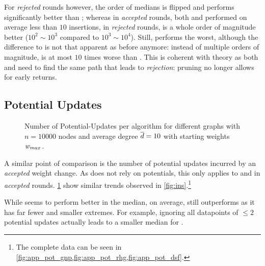 For \emph{rejected} rounds however, the order of medians is flipped and \algbd performs significantly better than \algdk; whereas in \emph{accepted} rounds, both \algdk and \algbd performed on average less than
$10$ insertions, in \emph{rejected} rounds, \algbd is a whole order of magnitude better ($10^2\sim 10^3$ compared to $10^3\sim 10^4$).
Still, \algbf performs the worst, although the difference to \algdk is not that apparent as before anymore: instead of multiple orders of magnitude, \algbf is at most $10$ times worse than \algdk.
This is coherent with theory as both \algbf and \algdk need to find the same path that leads to \emph{rejection}: pruning no longer allows for early returns.


\subsection{Potential Updates}
\begin{figure}[!tb]
  \centering
  \caption{
    Number of Potential-Updates per algorithm for different graphs with $n = 10000$ nodes and average degree $\overline{d} = 10$ with starting weights $w_{max}$.
  }
  \label{fig:pot}
\end{figure}

A similar point of comparison is the number of potential updates incurred by an \emph{accepted} weight change.
As \algbf does not rely on potentials, this only applies to \algdk and \algbd in \emph{accepted} rounds.
\cref{fig:pot} show similar trends observed in \cref{fig:ins}.\footnote{
  The complete data can be seen in \cref{fig:app_pot_gnp,fig:app_pot_rhg,fig:app_pot_dsf}.
}

While \algdk seems to perform better in the median, on average, \algbd still outperforms \algdk as it has far fewer and smaller extremes.
For example, ignoring all datapoints of $\leq 2$ potential updates actually leads to a smaller median for \algbd.

